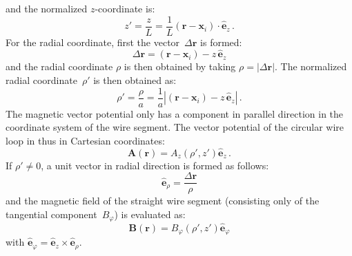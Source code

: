 and the normalized $z$-coordinate is:
\begin{equation}
  z' = \frac{z}{L} = \frac{1}{L} (\mathbf{r} - \mathbf{x}_i) \cdot \hat{\mathbf{e}}_z \, .
\end{equation}
For the radial coordinate, first the vector~$\Delta \mathbf{r}$ is formed:
\begin{equation}
  \Delta \mathbf{r} = (\mathbf{r} - \mathbf{x}_i) - z \, \hat{\mathbf{e}}_z
\end{equation}
and the radial coordinate $\rho$ is then obtained by taking $\rho = |\Delta \mathbf{r}|$.
The normalized radial coordinate~$\rho'$ is then obtained as:
\begin{equation}
  \rho' = \frac{\rho}{a} = \frac{1}{a} |(\mathbf{r} - \mathbf{x}_i) - z \, \hat{\mathbf{e}}_z| \, .
\end{equation}
The magnetic vector potential only has a component in parallel direction in the coordinate system of the wire segment.
The vector potential of the circular wire loop in thus in Cartesian coordinates:
\begin{equation}
  \mathbf{A}(\mathbf{r}) = A_z(\rho', z') \hat{\mathbf{e}}_z \, .
\end{equation}
If $\rho' \neq 0$, a unit vector in radial direction is formed as follows:
\begin{equation}
  \hat{\mathbf{e}}_\rho = \frac{\Delta \mathbf{r}}{\rho}
\end{equation}
and the magnetic field of the straight wire segment (consisting only of the tangential component~$B_\varphi$)
is evaluated as:
\begin{equation}
  \mathbf{B}(\mathbf{r}) = B_\varphi(\rho', z') \hat{\mathbf{e}}_\varphi
\end{equation}
with $\hat{\mathbf{e}}_\varphi = \hat{\mathbf{e}}_z \times \hat{\mathbf{e}}_\rho$.

